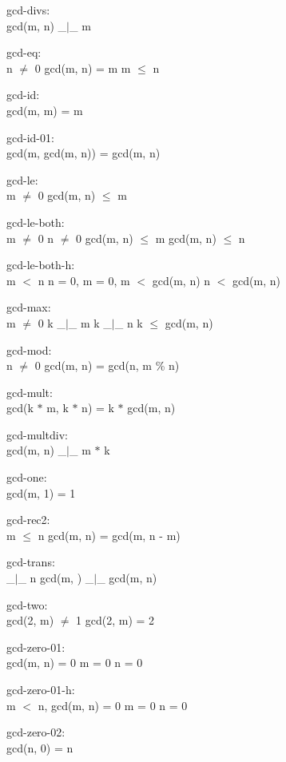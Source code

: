 \documentclass[a4paper]{article}
\begin{document}
gcd-divs:\\ \Fol gcd(m, n) \_$|$\_ m

gcd-eq:\\ \Fol n $\neq$ 0 \And gcd(m, n) = m \Imp m $\le$ n

gcd-id:\\ \Fol gcd(m, m) = m

gcd-id-01:\\ \Fol gcd(m, gcd(m, n)) = gcd(m, n)

gcd-le:\\ \Fol m $\neq$ 0 \Imp gcd(m, n) $\le$ m

gcd-le-both:\\ \Fol m $\neq$ 0 \And n $\neq$ 0 \Imp gcd(m, n) $\le$ m \And gcd(m, n) $\le$ n

gcd-le-both-h:\\m $<$ n \Fol n = 0, m = 0, \Not m $<$ gcd(m, n) \And \Not n $<$ gcd(m, n)

gcd-max:\\ \Fol m $\neq$ 0 \And k \_$|$\_ m \And k \_$|$\_ n \Imp k $\le$ gcd(m, n)

gcd-mod:\\n $\neq$ 0 \Fol gcd(m, n) = gcd(n, m \% n)

gcd-mult:\\ \Fol gcd(k $*$ m, k $*$ n) = k $*$ gcd(m, n)

gcd-multdiv:\\ \Fol gcd(m, n) \_$|$\_ m $*$ k

gcd-one:\\ \Fol gcd(m, 1) = 1

gcd-rec2:\\ \Fol m $\le$ n \Imp gcd(m, n) = gcd(m, n - m)

gcd-trans:\\ \Fol {} \_$|$\_ n \Imp gcd(m, ) \_$|$\_ gcd(m, n)

gcd-two:\\ \Fol gcd(2, m) $\neq$ 1 \Imp gcd(2, m) = 2

gcd-zero-01:\\ \Fol gcd(m, n) = 0 \Equiv m = 0 \And n = 0

gcd-zero-01-h:\\m $<$ n, gcd(m, n) = 0 \Fol m = 0 \And n = 0

gcd-zero-02:\\ \Fol gcd(n, 0) = n
\end{document}
